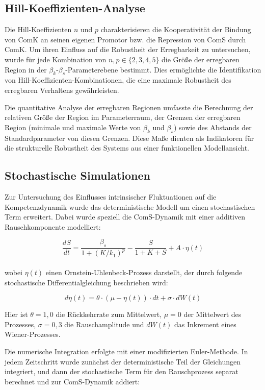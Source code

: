 \documentclass[11pt]{article}
\begin{document}
\subsection{Hill-Koeffizienten-Analyse}
Die Hill-Koeffizienten $n$ und $p$ charakterisieren die Kooperativität der Bindung von ComK an seinen eigenen Promotor bzw. die Repression von ComS durch ComK. Um ihren Einfluss auf die Robustheit der Erregbarkeit zu untersuchen, wurde für jede Kombination von $n, p \in \{2, 3, 4, 5\}$ die Größe der erregbaren Region in der $\beta_k$-$\beta_s$-Parameterebene bestimmt. Dies ermöglichte die Identifikation von Hill-Koeffizienten-Kombinationen, die eine maximale Robustheit des erregbaren Verhaltens gewährleisten.

Die quantitative Analyse der erregbaren Regionen umfasste die Berechnung der relativen Größe der Region im Parameterraum, der Grenzen der erregbaren Region (minimale und maximale Werte von $\beta_k$ und $\beta_s$) sowie des Abstands der Standardparameter von diesen Grenzen. Diese Maße dienten als Indikatoren für die strukturelle Robustheit des Systems aus einer funktionellen Modellansicht.

\subsection{Stochastische Simulationen}
Zur Untersuchung des Einflusses intrinsischer Fluktuationen auf die Kompetenzdynamik wurde das deterministische Modell um einen stochastischen Term erweitert. Dabei wurde speziell die ComS-Dynamik mit einer additiven Rauschkomponente modelliert:

\begin{equation}
\frac{dS}{dt} = \frac{\beta_s}{1 + (K/k_1)^p} - \frac{S}{1 + K + S} + A \cdot \eta(t)
\end{equation}
\\
wobei $\eta(t)$ einen Ornstein-Uhlenbeck-Prozess darstellt, der durch folgende stochastische Differentialgleichung beschrieben wird:

\begin{equation}
d\eta(t) = \theta \cdot (\mu - \eta(t)) \cdot dt + \sigma \cdot dW(t)
\end{equation}

Hier ist $\theta = 1,0$ die Rückkehrrate zum Mittelwert, $\mu = 0$ der Mittelwert des Prozesses, $\sigma = 0,3$ die Rauschamplitude und $dW(t)$ das Inkrement eines Wiener-Prozesses. 

Die numerische Integration erfolgte mit einer modifizierten Euler-Methode. In jedem Zeitschritt wurde zunächst der deterministische Teil der Gleichungen integriert, und dann der stochastische Term für den Rauschprozess separat berechnet und zur ComS-Dynamik addiert:
\end{document}
